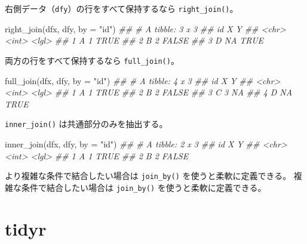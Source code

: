 \documentclass[
  letterpaper,
  xelatex,
  ja=standard, xelatex]{bxjsbook}
\newenvironment{Shaded}{\begin{snugshade}}{\end{snugshade}}
\newcommand{\AttributeTok}[1]{\textcolor[rgb]{0.40,0.45,0.13}{#1}}
\newcommand{\DocumentationTok}[1]{\textcolor[rgb]{0.37,0.37,0.37}{\textit{#1}}}
\newcommand{\FunctionTok}[1]{\textcolor[rgb]{0.28,0.35,0.67}{#1}}
\newcommand{\NormalTok}[1]{\textcolor[rgb]{0.00,0.23,0.31}{#1}}
\newcommand{\StringTok}[1]{\textcolor[rgb]{0.13,0.47,0.30}{#1}}
\begin{document}
右側データ（\texttt{dfy}）の行をすべて保持するなら
\texttt{right\_join()}。

\begin{Shaded}
\begin{Highlighting}[]
\FunctionTok{right\_join}\NormalTok{(dfx, dfy, }\AttributeTok{by =} \StringTok{"id"}\NormalTok{)}
\DocumentationTok{\#\# \# A tibble: 3 x 3}
\DocumentationTok{\#\#   id        X Y    }
\DocumentationTok{\#\#   \textless{}chr\textgreater{} \textless{}int\textgreater{} \textless{}lgl\textgreater{}}
\DocumentationTok{\#\# 1 A         1 TRUE }
\DocumentationTok{\#\# 2 B         2 FALSE}
\DocumentationTok{\#\# 3 D        NA TRUE}
\end{Highlighting}
\end{Shaded}

両方の行をすべて保持するなら \texttt{full\_join()}。

\begin{Shaded}
\begin{Highlighting}[]
\FunctionTok{full\_join}\NormalTok{(dfx, dfy, }\AttributeTok{by =} \StringTok{"id"}\NormalTok{)}
\DocumentationTok{\#\# \# A tibble: 4 x 3}
\DocumentationTok{\#\#   id        X Y    }
\DocumentationTok{\#\#   \textless{}chr\textgreater{} \textless{}int\textgreater{} \textless{}lgl\textgreater{}}
\DocumentationTok{\#\# 1 A         1 TRUE }
\DocumentationTok{\#\# 2 B         2 FALSE}
\DocumentationTok{\#\# 3 C         3 NA   }
\DocumentationTok{\#\# 4 D        NA TRUE}
\end{Highlighting}
\end{Shaded}

\texttt{inner\_join()} は共通部分のみを抽出する。

\begin{Shaded}
\begin{Highlighting}[]
\FunctionTok{inner\_join}\NormalTok{(dfx, dfy, }\AttributeTok{by =} \StringTok{"id"}\NormalTok{)}
\DocumentationTok{\#\# \# A tibble: 2 x 3}
\DocumentationTok{\#\#   id        X Y    }
\DocumentationTok{\#\#   \textless{}chr\textgreater{} \textless{}int\textgreater{} \textless{}lgl\textgreater{}}
\DocumentationTok{\#\# 1 A         1 TRUE }
\DocumentationTok{\#\# 2 B         2 FALSE}
\end{Highlighting}
\end{Shaded}

より複雑な条件で結合したい場合は \texttt{join\_by()}
を使うと柔軟に定義できる。 複雑な条件で結合したい場合は
\texttt{join\_by()} を使うと柔軟に定義できる。

\section{tidyr}\label{tidyr}
\end{document}
